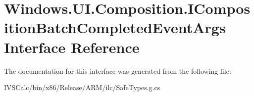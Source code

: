 \hypertarget{interface_windows_1_1_u_i_1_1_composition_1_1_i_composition_batch_completed_event_args}{}\section{Windows.\+U\+I.\+Composition.\+I\+Composition\+Batch\+Completed\+Event\+Args Interface Reference}
\label{interface_windows_1_1_u_i_1_1_composition_1_1_i_composition_batch_completed_event_args}


The documentation for this interface was generated from the following file\+:\begin{DoxyCompactItemize}
\item 
I\+V\+S\+Calc/bin/x86/\+Release/\+A\+R\+M/ilc/Safe\+Types.\+g.\+cs\end{DoxyCompactItemize}
